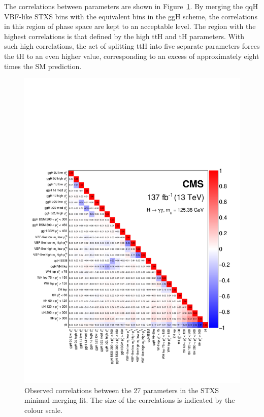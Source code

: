 The correlations between parameters are shown in Figure~\ref{fig:stage1p2_minimal_correlations}. By merging the qqH VBF-like STXS bins with the equivalent bins in the ggH scheme, the correlations in this region of phase space are kept to an acceptable level. The region with the highest correlations is that defined by the high \ptH ttH and tH parameters. With such high correlations, the act of splitting ttH into five separate parameters forces the tH \xsbr to an even higher value, corresponding to an excess of approximately eight times the SM prediction. 


\begin{figure}
  \centering
  \includegraphics[width=1\textwidth]{Figures/hgg_results/stage1p2_minimal_correlations.pdf}
  \caption[Correlations in the minimal-merging parameters]
  {
    Observed correlations between the 27 parameters in the STXS minimal-merging fit. The size of the correlations is indicated by the colour scale.
  }
  \label{fig:stage1p2_minimal_correlations}
\end{figure}

